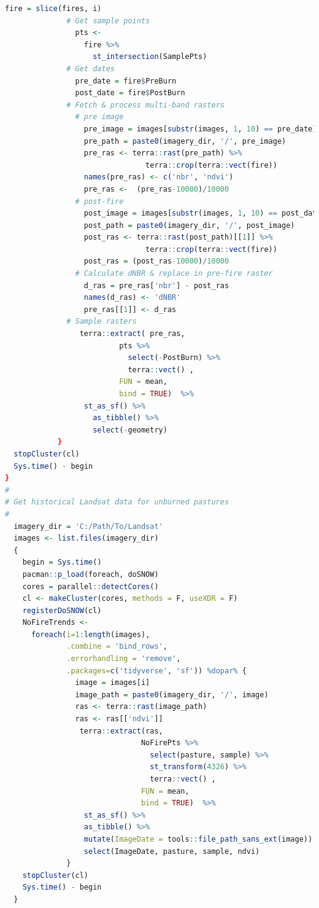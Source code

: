 \documentclass[
]{article}
\begin{document}
\begin{lstlisting}[language=R]
                fire = slice(fires, i)
              # Get sample points
                pts <-
                  fire %>%
                    st_intersection(SamplePts)
              # Get dates
                pre_date = fire$PreBurn
                post_date = fire$PostBurn
              # Fetch & process multi-band rasters
                # pre image
                  pre_image = images[substr(images, 1, 10) == pre_date]
                  pre_path = paste0(imagery_dir, '/', pre_image)
                  pre_ras <- terra::rast(pre_path) %>%
                                terra::crop(terra::vect(fire))
                  names(pre_ras) <- c('nbr', 'ndvi') 
                  pre_ras <-  (pre_ras-10000)/10000
                # post-fire
                  post_image = images[substr(images, 1, 10) == post_date]
                  post_path = paste0(imagery_dir, '/', post_image)
                  post_ras <- terra::rast(post_path)[[1]] %>%
                                terra::crop(terra::vect(fire))
                  post_ras = (post_ras-10000)/10000
                # Calculate dNBR & replace in pre-fire raster
                  d_ras = pre_ras['nbr'] - post_ras
                  names(d_ras) <- 'dNBR'
                  pre_ras[[1]] <- d_ras
              # Sample rasters
                 terra::extract( pre_ras,
                          pts %>%
                            select(-PostBurn) %>%
                            terra::vect() , 
                          FUN = mean, 
                          bind = TRUE)  %>%
                  st_as_sf() %>%
                    as_tibble() %>%
                    select(-geometry) 
            }
  stopCluster(cl)
  Sys.time() - begin 
}
#
# Get historical Landsat data for unburned pastures
#
  imagery_dir = 'C:/Path/To/Landsat'
  images <- list.files(imagery_dir)
  { 
    begin = Sys.time() 
    pacman::p_load(foreach, doSNOW)
    cores = parallel::detectCores()
    cl <- makeCluster(cores, methods = F, useXDR = F)
    registerDoSNOW(cl)
    NoFireTrends <-
      foreach(i=1:length(images), 
              .combine = 'bind_rows',
              .errorhandling = 'remove', 
              .packages=c('tidyverse', 'sf')) %dopar% {
                image = images[i]
                image_path = paste0(imagery_dir, '/', image)
                ras <- terra::rast(image_path)
                ras <- ras[['ndvi']]
                 terra::extract(ras,
                               NoFirePts %>%
                                 select(pasture, sample) %>%
                                 st_transform(4326) %>%
                                 terra::vect() , 
                               FUN = mean, 
                               bind = TRUE)  %>%
                  st_as_sf() %>%
                  as_tibble() %>%
                  mutate(ImageDate = tools::file_path_sans_ext(image))  %>%
                  select(ImageDate, pasture, sample, ndvi) 
              }
    stopCluster(cl)
    Sys.time() - begin 
  }
\end{lstlisting}
\end{document}
